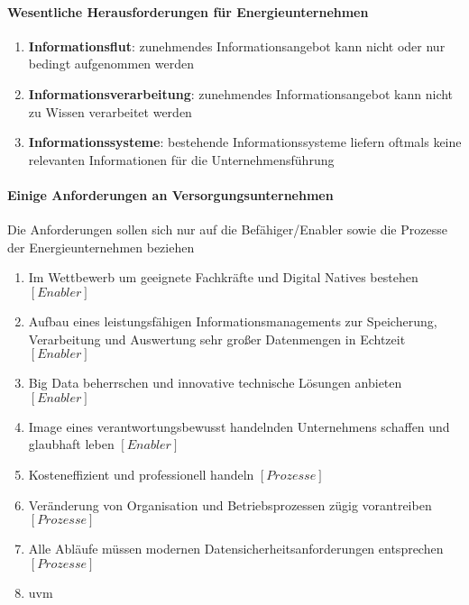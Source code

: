 \paragraph{Wesentliche Herausforderungen für Energieunternehmen \citep[S. 21]{Doleski2016}}
\begin{enumerate}
  \item \textbf{Informationsflut}: zunehmendes Informationsangebot kann nicht oder nur bedingt aufgenommen werden
  \item \textbf{Informationsverarbeitung}: zunehmendes Informationsangebot kann nicht zu Wissen verarbeitet werden
  \item \textbf{Informationssysteme}: bestehende Informationssysteme liefern oftmals keine relevanten Informationen für die Unternehmensführung
\end{enumerate}
%


\paragraph{Einige Anforderungen an Versorgungsunternehmen}
Die Anforderungen sollen sich nur auf die Befähiger/Enabler sowie die Prozesse der Energieunternehmen beziehen
\begin{enumerate}
  \item Im Wettbewerb um geeignete Fachkräfte und Digital Natives bestehen $[Enabler]$
  \item Aufbau eines leistungsfähigen Informationsmanagements zur Speicherung, Verarbeitung und Auswertung sehr großer Datenmengen in Echtzeit $[Enabler]$
  \item Big Data beherrschen und innovative technische Lösungen anbieten $[Enabler]$
  \item Image eines verantwortungsbewusst handelnden Unternehmens schaffen und glaubhaft leben $[Enabler]$
  \item Kosteneffizient und professionell handeln $[Prozesse]$
  \item Veränderung von Organisation und Betriebsprozessen zügig vorantreiben $[Prozesse]$
  \item Alle Abläufe müssen modernen Datensicherheitsanforderungen entsprechen $[Prozesse]$
  \item uvm
\end{enumerate}
